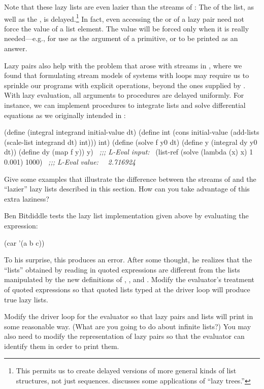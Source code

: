 \noindent
Note that these lazy lists are even lazier than the streams of :
The  of the list, as well as the , is
delayed.\footnote{This permits us to create delayed versions of more general
kinds of list structures, not just sequences.   discusses some
applications of ``lazy trees.''}  In fact, even accessing the  or
 of a lazy pair need not force the value of a list element.  The
value will be forced only when it is really needed---e.g., for use as the
argument of a primitive, or to be printed as an answer.

Lazy pairs also help with the problem that arose with streams in
, where we found that formulating stream models of systems with
loops may require us to sprinkle our programs with explicit 
operations, beyond the ones supplied by .  With lazy
evaluation, all arguments to procedures are delayed uniformly.  For instance,
we can implement procedures to integrate lists and solve differential equations
as we originally intended in :

\begin{codeBlock}
(define (integral integrand initial-value dt)
  (define int
    (cons initial-value
          (add-lists (scale-list integrand dt) int)))
  int)
(define (solve f y0 dt)
  (define  y (integral dy y0 dt))
  (define dy (map f y))
  y)
~\textit{;;; L-Eval input:}~
(list-ref (solve (lambda (x) x) 1 0.001) 1000)
~\textit{;;; L-Eval value:}~
~\textit{2.716924}~
\end{codeBlock}

\begin{exerciseGroup}
\label{Exercise 4.32}
 Give some examples that
illustrate the difference between the streams of  and the
``lazier'' lazy lists described in this section.  How can you take advantage of
this extra laziness?

\label{Exercise 4.33}
 Ben Bitdiddle tests the lazy list
implementation given above by evaluating the expression:

\begin{codeBlock}
(car '(a b c))
\end{codeBlock}

To his surprise, this produces an error.  After some thought, he realizes that
the ``lists'' obtained by reading in quoted expressions are different from the
lists manipulated by the new definitions of , , and
.  Modify the evaluator's treatment of quoted expressions so that
quoted lists typed at the driver loop will produce true lazy lists.

\label{Exercise 4.34}
 Modify the driver loop for the
evaluator so that lazy pairs and lists will print in some reasonable way.
(What are you going to do about infinite lists?)  You may also need to modify
the representation of lazy pairs so that the evaluator can identify them in
order to print them.
\end{exerciseGroup}


